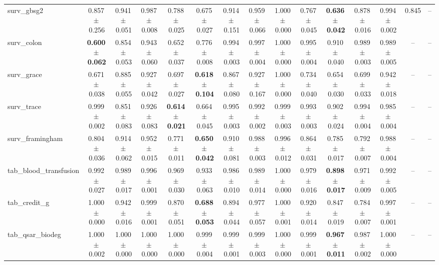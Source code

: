 \documentclass[8pt]{extarticle}
\begin{document}
\begin{longtable}{l*{14}{c}}
surv\_gbsg2 & 0.857\,$\pm$\,0.256 & 0.941\,$\pm$\,0.051 & 0.987\,$\pm$\,0.008 & 0.788\,$\pm$\,0.025 & 0.675\,$\pm$\,0.027 & 0.914\,$\pm$\,0.151 & 0.959\,$\pm$\,0.066 & 1.000\,$\pm$\,0.000 & 0.767\,$\pm$\,0.045 & \textbf{0.636\,$\pm$\,0.042} & 0.878\,$\pm$\,0.016 & 0.994\,$\pm$\,0.002 & 0.845 & -- \\
surv\_colon & \textbf{0.600\,$\pm$\,0.062} & 0.854\,$\pm$\,0.053 & 0.943\,$\pm$\,0.060 & 0.652\,$\pm$\,0.037 & 0.776\,$\pm$\,0.008 & 0.994\,$\pm$\,0.003 & 0.997\,$\pm$\,0.004 & 1.000\,$\pm$\,0.000 & 0.995\,$\pm$\,0.004 & 0.910\,$\pm$\,0.040 & 0.989\,$\pm$\,0.003 & 0.989\,$\pm$\,0.005 & -- & -- \\
surv\_grace & 0.671\,$\pm$\,0.038 & 0.885\,$\pm$\,0.055 & 0.927\,$\pm$\,0.042 & 0.697\,$\pm$\,0.027 & \textbf{0.618\,$\pm$\,0.104} & 0.867\,$\pm$\,0.080 & 0.927\,$\pm$\,0.167 & 1.000\,$\pm$\,0.000 & 0.734\,$\pm$\,0.040 & 0.654\,$\pm$\,0.030 & 0.699\,$\pm$\,0.033 & 0.942\,$\pm$\,0.018 & -- & -- \\
surv\_trace & 0.999\,$\pm$\,0.002 & 0.851\,$\pm$\,0.083 & 0.926\,$\pm$\,0.083 & \textbf{0.614\,$\pm$\,0.021} & 0.664\,$\pm$\,0.045 & 0.995\,$\pm$\,0.003 & 0.992\,$\pm$\,0.002 & 0.999\,$\pm$\,0.003 & 0.993\,$\pm$\,0.003 & 0.902\,$\pm$\,0.024 & 0.994\,$\pm$\,0.004 & 0.985\,$\pm$\,0.004 & -- & -- \\
surv\_framingham & 0.804\,$\pm$\,0.036 & 0.914\,$\pm$\,0.062 & 0.952\,$\pm$\,0.015 & 0.771\,$\pm$\,0.011 & \textbf{0.650\,$\pm$\,0.042} & 0.910\,$\pm$\,0.081 & 0.988\,$\pm$\,0.003 & 0.996\,$\pm$\,0.012 & 0.864\,$\pm$\,0.031 & 0.785\,$\pm$\,0.017 & 0.792\,$\pm$\,0.007 & 0.988\,$\pm$\,0.004 & -- & -- \\
tab\_blood\_transfusion & 0.992\,$\pm$\,0.027 & 0.989\,$\pm$\,0.017 & 0.996\,$\pm$\,0.001 & 0.969\,$\pm$\,0.030 & 0.933\,$\pm$\,0.063 & 0.986\,$\pm$\,0.010 & 0.989\,$\pm$\,0.014 & 1.000\,$\pm$\,0.000 & 0.979\,$\pm$\,0.016 & \textbf{0.898\,$\pm$\,0.017} & 0.971\,$\pm$\,0.009 & 0.992\,$\pm$\,0.005 & -- & -- \\
tab\_credit\_g & 1.000\,$\pm$\,0.000 & 0.942\,$\pm$\,0.016 & 0.999\,$\pm$\,0.001 & 0.870\,$\pm$\,0.051 & \textbf{0.688\,$\pm$\,0.053} & 0.894\,$\pm$\,0.044 & 0.977\,$\pm$\,0.057 & 1.000\,$\pm$\,0.001 & 0.920\,$\pm$\,0.014 & 0.847\,$\pm$\,0.019 & 0.784\,$\pm$\,0.007 & 0.997\,$\pm$\,0.001 & -- & -- \\
tab\_qsar\_biodeg & 1.000\,$\pm$\,0.002 & 1.000\,$\pm$\,0.000 & 1.000\,$\pm$\,0.000 & 1.000\,$\pm$\,0.000 & 0.999\,$\pm$\,0.004 & 0.999\,$\pm$\,0.001 & 0.999\,$\pm$\,0.003 & 1.000\,$\pm$\,0.000 & 0.999\,$\pm$\,0.001 & \textbf{0.967\,$\pm$\,0.011} & 0.987\,$\pm$\,0.002 & 1.000\,$\pm$\,0.000 & -- & -- \\

\end{longtable}
\end{document}
